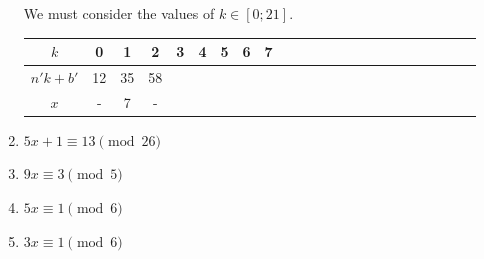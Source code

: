 \begin{description}
\begin{enumerate}
We must consider the values of $k \in [0; 21]$.

\begin{tabular}{|c|c c c c c c c c c c c c c c c c c c c c c c|}
\hline
$k$         & 0  & 1  & 2  & 3  & 4  & 5  & 6  & 7  & \\
\hline
$n' k + b'$ & 12 & 35 & 58 & \\
$x$         & -  & 7  & -  & \\
\hline
\end{tabular}

\item $5x + 1 \equiv 13 \pmod {26}$
\item $9x \equiv 3 \pmod 5$
\item $5x \equiv 1 \pmod 6$
\item $3x \equiv 1 \pmod 6$

\end{enumerate}

\end{description}
